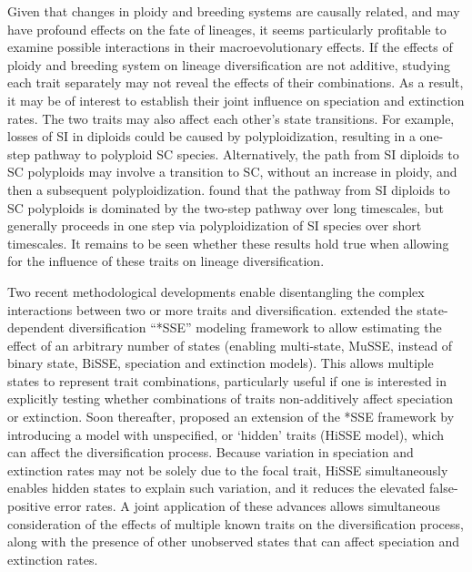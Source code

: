 Given that changes in ploidy and breeding systems are causally related, and may have profound effects on the fate of lineages, it seems particularly profitable to examine possible interactions in their macroevolutionary effects.
If the effects of ploidy and breeding system on lineage diversification are not additive, studying each trait separately may not reveal the effects of their combinations.
As a result, it may be of interest to establish their joint influence on speciation and extinction rates.
The two traits may also affect each other's state transitions.
For example, losses of SI in diploids could be caused by polyploidization, resulting in a one-step pathway to polyploid SC species. 
Alternatively, the path from SI diploids to SC polyploids may involve a transition to SC, without an increase in ploidy, and then a subsequent polyploidization. 
\citet{robertson_2011} found that the pathway from SI diploids to SC polyploids is dominated by the two-step pathway over long timescales, but generally proceeds in one step via polyploidization of SI species over short timescales.
It remains to be seen whether these results hold true when allowing for the influence of these traits on lineage diversification.

Two recent methodological developments enable disentangling the complex interactions between two or more traits and diversification.
\citet{fitzjohn_2012} extended the state-dependent diversification ``*SSE'' modeling framework \citep{maddison_2007} to allow estimating the effect of an arbitrary number of states (enabling multi-state, MuSSE, instead of binary state, BiSSE, speciation and extinction models).
This allows multiple states to represent trait combinations, particularly useful if one is interested in explicitly testing whether combinations of traits non-additively affect speciation or extinction. 
Soon thereafter, \citet{beaulieu_2016} proposed an extension of the *SSE framework by introducing a model with unspecified, or `hidden' traits (HiSSE model), which can affect the diversification process.
Because variation in speciation and extinction rates may not be solely due to the focal trait, HiSSE simultaneously enables hidden states to explain such variation, and it reduces the elevated false-positive error rates.
A joint application of these advances allows simultaneous consideration of the effects of multiple known traits on the diversification process, along with the presence of other unobserved states that can affect speciation and extinction rates. 

